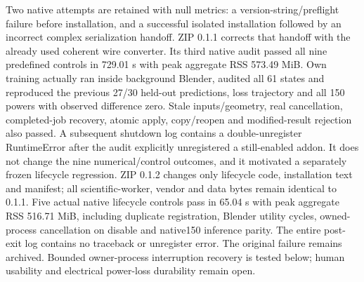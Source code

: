 \documentclass[
  10pt,
]{article}
\begin{document}
Two native attempts are retained with null metrics: a
version-string/preflight failure before installation, and a successful
isolated installation followed by an incorrect complex serialization
handoff. ZIP 0.1.1 corrects that handoff with the already used coherent
wire converter. Its third native audit passed all nine predefined
controls in 729.01 s with peak aggregate RSS 573.49 MiB. Own training
actually ran inside background Blender, audited all 61 states and
reproduced the previous 27/30 held-out predictions, loss trajectory and
all 150 powers with observed difference zero. Stale inputs/geometry,
real cancellation, completed-job recovery, atomic apply, copy/reopen and
modified-result rejection also passed. A subsequent shutdown log
contains a double-unregister RuntimeError after the audit explicitly
unregistered a still-enabled addon. It does not change the nine
numerical/control outcomes, and it motivated a separately frozen
lifecycle regression. ZIP 0.1.2 changes only lifecycle code,
installation text and manifest; all scientific-worker, vendor and data
bytes remain identical to 0.1.1. Five actual native lifecycle controls
pass in 65.04 s with peak aggregate RSS 516.71 MiB, including duplicate
registration, Blender utility cycles, owned-process cancellation on
disable and native150 inference parity. The entire post-exit log
contains no traceback or unregister error. The original failure remains
archived. Bounded owner-process interruption recovery is tested below;
human usability and electrical power-loss durability remain open.
\end{document}

